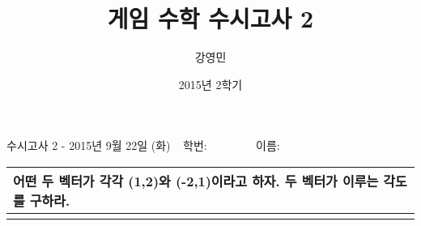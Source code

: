 \documentclass{beamer}
\title[게임수학 - 수시고사2]{ 게임 수학 수시고사 2}
\author{강영민}
\institute{동명대학교}
\date{2015년 2학기}
\begin{document}




\begin{frame}{\small 수시고사 2 - 2015년 9월 22일 (화) $~~$ 학번:$~~~~~~~~~~~~~~~~~~$                이름:  }

\begin{tabular}{|p{11cm}|} \hline
\tiny 어떤 두 벡터가 각각 (1,2)와 (-2,1)이라고 하자. 두 벡터가 이루는 각도를 구하라.
\\ \hline \hline
 \\ [35ex] \hline 
\end{tabular}

\end{frame}


\end{document}
